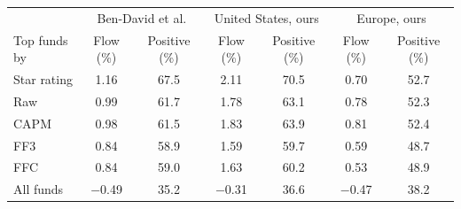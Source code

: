 \begin{tabular}{lcccccc}
\toprule
 & \multicolumn{2}{c}{Ben-David et al.} & \multicolumn{2}{c}{United States, ours} & \multicolumn{2}{c}{Europe, ours} \\
Top funds by & Flow (\%) & Positive (\%) & Flow (\%) & Positive (\%) & Flow (\%) & Positive (\%) \\
\midrule
Star rating & 1.16 & 67.5 & 2.11 & 70.5 & 0.70 & 52.7 \\
Raw & 0.99 & 61.7 & 1.78 & 63.1 & 0.78 & 52.3 \\
CAPM & 0.98 & 61.5 & 1.83 & 63.9 & 0.81 & 52.4 \\
FF3 & 0.84 & 58.9 & 1.59 & 59.7 & 0.59 & 48.7 \\
FFC & 0.84 & 59.0 & 1.63 & 60.2 & 0.53 & 48.9 \\
All funds & $-$0.49 & 35.2 & $-$0.31 & 36.6 & $-$0.47 & 38.2 \\
\bottomrule
\end{tabular}
